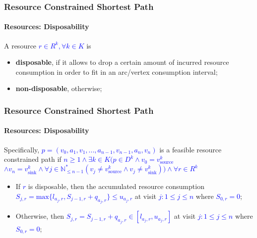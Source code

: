 \begin{frame}
  \frametitle{Resource Constrained Shortest Path}
  \framesubtitle{Resources: Disposability}
  A resource \textcolor{blue}{$r \in R^k, \forall k \in K$} is
  \begin{itemize}
    \item \textbf{disposable}, if it allows to drop a certain amount of incurred resource consumption in order to fit in an arc/vertex consumption interval;
    \item \textbf{non-disposable}, otherwise;
  \end{itemize}
\end{frame}

\begin{frame}
  \frametitle{Resource Constrained Shortest Path}
  \framesubtitle{Resources: Disposability}
  Specifically, \textcolor{blue}{$p = (v_0, a_1, v_1, ..., a_{n - 1}, v_{n - 1}, a_n, v_n)$} is a feasible resource constrained path if 
\textcolor{blue}{$n \geqslant 1 \wedge \exists k \in K (p \in D^k \wedge v_0 = v_{\text{source}}^k $} \textcolor{blue}{$\wedge v_n = v_{\text{sink}}^k \wedge \forall j \in \mathbb{N}_{\leqslant n - 1}^{*} (v_j \neq v^k_{\text{source}} \wedge v_j \neq v^k_{\text{sink}})) \wedge \forall r \in R^k$}
  \begin{itemize}
    \item If \textcolor{blue}{$r$} is disposable, then the accumulated resource consumption \textcolor{blue}{$S_{j,r} = \text{max}\{l_{a_j,r}, S_{j - 1, r} + q_{a_j,r}\} \leqslant u_{a_j, r}$} at visit \textcolor{blue}{$j : 1 \leqslant j \leqslant n$} where \textcolor{blue}{$S_{0,r} = 0$};
    \item Otherwise, then \textcolor{blue}{$S_{j,r} = S_{j - 1, r} + q_{a_j,r} \in [l_{a_j, r}, u_{a_j, r}]$} at visit \textcolor{blue}{$j : 1 \leqslant j \leqslant n$} where \textcolor{blue}{$S_{0,r} = 0$};
  \end{itemize}
\end{frame}

